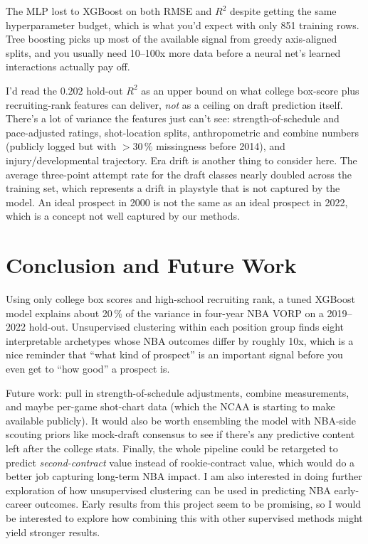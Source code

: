 \documentclass[conference]{IEEEtran}
\begin{document}
The MLP lost to XGBoost on both RMSE and $R^2$ despite getting the same
hyperparameter budget, which is what you'd expect with only 851
training rows. Tree boosting picks up most of the available signal
from greedy axis-aligned splits, and you usually need 10--100x more
data before a neural net's learned interactions actually pay off.

I'd read the $0.202$ hold-out $R^2$ as an upper bound on what
college box-score plus recruiting-rank features can deliver, \emph{not}
as a ceiling on draft prediction itself. There's a lot of variance the
features just can't see: strength-of-schedule and pace-adjusted
ratings, shot-location splits, anthropometric and
combine numbers (publicly logged but with $>30\,\%$ missingness before
2014), and injury/developmental trajectory. Era drift is another thing to consider here. The average three-point attempt rate for the draft classes nearly doubled across the training set, which represents a drift in playstyle that is not captured by the model. An ideal prospect in 2000 is not the same as an ideal prospect in 2022, which is a concept not well captured by our methods.

\section{Conclusion and Future Work}

Using only college box scores and high-school recruiting rank, a
tuned XGBoost model explains about 20\,\% of the variance in four-year
NBA VORP on a 2019--2022 hold-out. Unsupervised clustering within each position group finds eight interpretable archetypes whose NBA outcomes differ by roughly 10x, which is a nice reminder that ``what kind of prospect'' is an important signal before you even get to ``how good'' a prospect is.

Future work: pull in strength-of-schedule adjustments, combine
measurements, and maybe per-game shot-chart data (which the NCAA is
starting to make available publicly). It would also be worth ensembling
the model with NBA-side scouting priors like mock-draft consensus to
see if there's any predictive content left after the college stats.
Finally, the whole pipeline could be retargeted to predict
\emph{second-contract} value instead of rookie-contract value, which
would do a better job capturing long-term NBA impact. I am also interested in doing further exploration of how unsupervised clustering can be used in predicting NBA early-career outcomes. Early results from this project seem to be promising, so I would be interested to explore how combining this with other supervised methods might yield stronger results.
\end{document}
